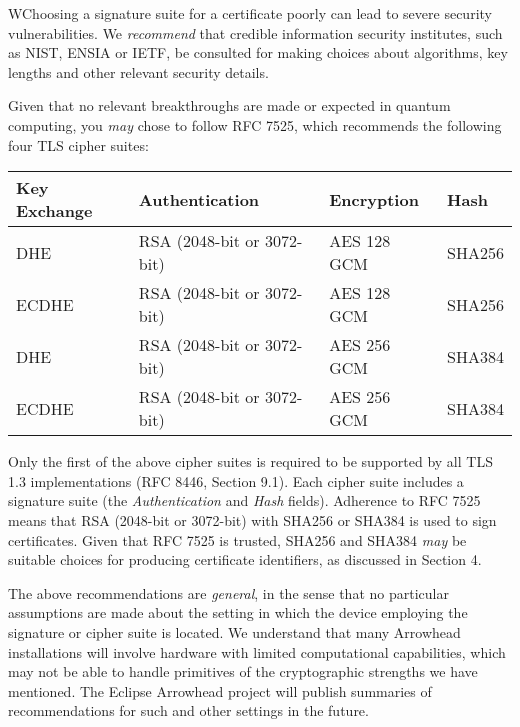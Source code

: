 %
%

WChoosing a signature suite for a certificate poorly can lead to severe security vulnerabilities.
We \textit{recommend} that credible information security institutes, such as NIST, ENSIA or IETF, be consulted for making choices about algorithms, key lengths and other relevant security details.

Given that no relevant breakthroughs are made or expected in quantum computing, you \textit{may} chose to follow RFC 7525, which recommends the following four TLS cipher suites:

\vspace*{0.5cm}
\noindent\begin{tabularx}{\textwidth}{| p{2.5cm} | p{4.5cm} | p{2.5cm} | X |} \hline
\rowcolor{gray!33} Key Exchange & Authentication             & Encryption  & Hash \\ \hline

DHE                             & RSA (2048-bit or 3072-bit) & AES 128 GCM & SHA256 \\ \hline
ECDHE                           & RSA (2048-bit or 3072-bit) & AES 128 GCM & SHA256 \\ \hline
DHE                             & RSA (2048-bit or 3072-bit) & AES 256 GCM & SHA384 \\ \hline
ECDHE                           & RSA (2048-bit or 3072-bit) & AES 256 GCM & SHA384 \\ \hline

\end{tabularx}
\vspace*{0.5cm}

Only the first of the above cipher suites is required to be supported by all TLS 1.3 implementations (RFC 8446, Section 9.1).
Each cipher suite includes a signature suite (the \textit{Authentication} and \textit{Hash} fields).
Adherence to RFC 7525 means that RSA (2048-bit or 3072-bit) with SHA256 or SHA384 is used to sign certificates.
Given that RFC 7525 is trusted, SHA256 and SHA384 \textit{may} be suitable choices for producing certificate identifiers, as discussed in Section 4.

The above recommendations are \textit{general}, in the sense that no particular assumptions are made about the setting in which the device employing the signature or cipher suite is located.
We understand that many Arrowhead installations will involve hardware with limited computational capabilities, which may not be able to handle primitives of the cryptographic strengths we have mentioned.
The Eclipse Arrowhead project will publish summaries of recommendations for such and other settings in the future.